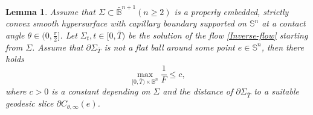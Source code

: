 \documentclass[11pt,reqno]{amsart}
\newtheorem{lem}[thm]{Lemma}
\theoremstyle{definition}
\theoremstyle{remark}
\numberwithin{equation}{section}
\renewcommand{\(}{\left(}
\renewcommand{\)}{\right)}
\renewcommand{\-}{\overline}
\begin{document}
\begin{lem}\label{lowbound-F}
	Assume that $\Sigma\subset\bar{\mathbb{B}}^{n+1} (n\geq 2)$ is a properly embedded, strictly convex smooth hypersurface with capillary boundary supported on $\mathbb{S}^n$ at a contact angle $\theta\in(0,\frac{\pi}{2}]$. Let $\Sigma_t,t\in[0,\bar{T})$ be the solution of the flow \eqref{Inverse-flow} starting from $\Sigma$. Assume that $\partial\Sigma_{\bar{T}}$ is not a flat ball around some point $e\in\mathbb{S}^n$, then there holds
	\begin{equation}\label{lower-F}
		\max_{[0,\bar{T})\times\mathbb{B}^n}{\frac{1}{F}}\leq c,
	\end{equation}
where $c>0$ is a constant depending on $\Sigma$ and the distance of $\partial\Sigma_{\bar{T}}$ to a suitable geodesic slice $\partial C_{\theta,\infty}(e)$.
\end{lem}
\end{document}

